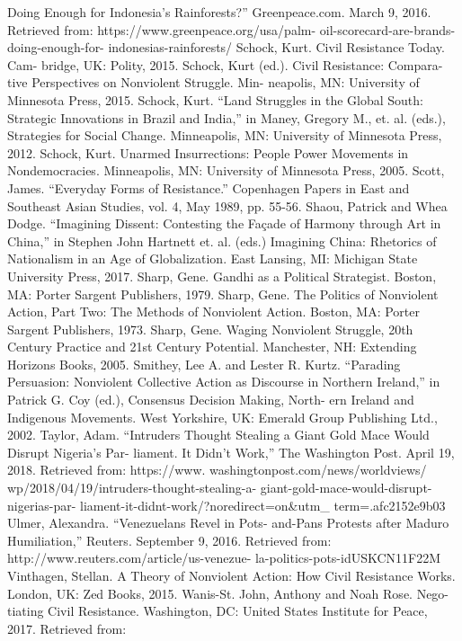 \documentclass[twoside,a4paper,12pt,fleqn,openany]{extbook}
\begin{document}
Doing Enough for Indonesia’s Rainforests?”
Greenpeace.com. March 9, 2016. Retrieved
from: https://www.greenpeace.org/usa/palm-
oil-scorecard-are-brands-doing-enough-for-
indonesias-rainforests/
Schock, Kurt. Civil Resistance Today. Cam-
bridge, UK: Polity, 2015.
Schock, Kurt (ed.). Civil Resistance: Compara-
tive Perspectives on Nonviolent Struggle. Min-
neapolis, MN: University of Minnesota Press,
2015.
Schock, Kurt. “Land Struggles in the Global
South: Strategic Innovations in Brazil and India,”
in Maney, Gregory M., et. al. (eds.), Strategies
for Social Change. Minneapolis, MN: University
of Minnesota Press, 2012.
Schock, Kurt. Unarmed Insurrections: People
Power Movements in Nondemocracies.
Minneapolis, MN: University of Minnesota
Press, 2005.
Scott, James. “Everyday Forms of Resistance.”
Copenhagen Papers in East and Southeast
Asian Studies, vol. 4, May 1989, pp. 55-56.
Shaou, Patrick and Whea Dodge. “Imagining
Dissent: Contesting the Façade of Harmony
through Art in China,” in Stephen John Hartnett
et. al. (eds.) Imagining China: Rhetorics
of Nationalism in an Age of Globalization.
East Lansing, MI: Michigan State University
Press, 2017.
Sharp, Gene. Gandhi as a Political Strategist.
Boston, MA: Porter Sargent Publishers, 1979.
Sharp, Gene. The Politics of Nonviolent Action,
Part Two: The Methods of Nonviolent Action.
Boston, MA: Porter Sargent Publishers, 1973.
Sharp, Gene. Waging Nonviolent Struggle,
20th Century Practice and 21st Century Potential.
Manchester, NH: Extending Horizons Books,
2005.
Smithey, Lee A. and Lester R. Kurtz. “Parading
Persuasion: Nonviolent Collective Action as
Discourse in Northern Ireland,” in Patrick G.
Coy (ed.), Consensus Decision Making, North-
ern Ireland and Indigenous Movements. West
Yorkshire, UK: Emerald Group Publishing
Ltd., 2002.
Taylor, Adam. “Intruders Thought Stealing a
Giant Gold Mace Would Disrupt Nigeria’s Par-
liament. It Didn’t Work,” The Washington Post.
April 19, 2018. Retrieved from: https://www.
washingtonpost.com/news/worldviews/
wp/2018/04/19/intruders-thought-stealing-a-
giant-gold-mace-would-disrupt-nigerias-par-
liament-it-didnt-work/?noredirect=on&utm_
term=.afc2152e9b03
Ulmer, Alexandra. “Venezuelans Revel in Pots-
and-Pans Protests after Maduro Humiliation,”
Reuters. September 9, 2016. Retrieved from:
http://www.reuters.com/article/us-venezue-
la-politics-pots-idUSKCN11F22M
Vinthagen, Stellan. A Theory of Nonviolent
Action: How Civil Resistance Works. London,
UK: Zed Books, 2015.
Wanis-St. John, Anthony and Noah Rose. Nego-
tiating Civil Resistance. Washington, DC: United
States Institute for Peace, 2017. Retrieved from:
\end{document}
